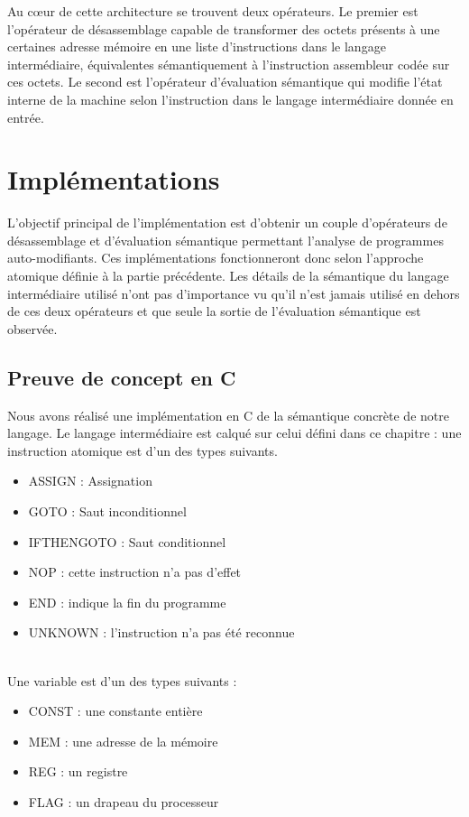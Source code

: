 Au c\oe ur de cette architecture se trouvent deux opérateurs. Le premier est l'opérateur de désassemblage capable de transformer des octets présents à une certaines adresse mémoire en une liste d'instructions dans le langage intermédiaire, équivalentes sémantiquement à l'instruction assembleur codée sur ces octets. 
Le second est l'opérateur d'évaluation sémantique qui modifie l'état interne de la machine selon l'instruction dans le langage intermédiaire donnée en entrée.

\section{Implémentations}
L'objectif principal de l'implémentation est d'obtenir un couple d'opérateurs de désassemblage et d'évaluation sémantique permettant l'analyse de programmes auto-modifiants. Ces implémentations fonctionneront donc selon l'approche atomique définie à la partie précédente.
Les détails de la sémantique du langage intermédiaire utilisé n'ont pas d'importance vu qu'il n'est jamais utilisé en dehors de ces deux opérateurs et que seule la sortie de l'évaluation sémantique est observée.

\subsection{Preuve de concept en C}
Nous avons réalisé une implémentation en C de la sémantique concrète de notre langage.
Le langage intermédiaire est calqué sur celui défini dans ce chapitre : une instruction atomique est d'un des types suivants.
\begin{itemize}
 \item ASSIGN : Assignation
 \item GOTO : Saut inconditionnel
 \item IFTHENGOTO : Saut conditionnel
 \item NOP : cette instruction n'a pas d'effet
 \item END : indique la fin du programme
 \item UNKNOWN : l'instruction n'a pas été reconnue
\end{itemize}
~\\
Une variable est d'un des types suivants :
\begin{itemize}
  \item CONST : une constante entière
  \item MEM : une adresse de la mémoire
  \item REG : un registre
  \item FLAG : un drapeau du processeur
\end{itemize}

